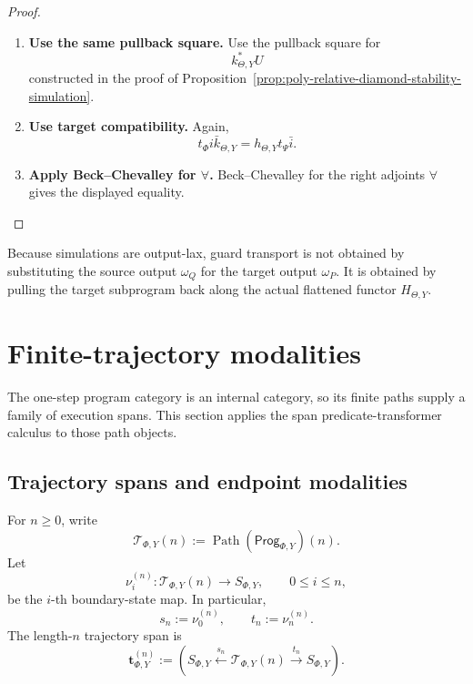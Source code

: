 \begin{proof}
\leavevmode
\begin{enumerate}
\item \textbf{Use the same pullback square.}
Use the pullback square for
\[
k_{\Theta,Y}^\ast U
\]
constructed in the proof of
Proposition~\ref{prop:poly-relative-diamond-stability-simulation}.

\item \textbf{Use target compatibility.}
Again,
\[
t_\Phi i\bar k_{\Theta,Y}=h_{\Theta,Y}t_\Psi\bar i.
\]

\item \textbf{Apply Beck--Chevalley for \(\forall\).}
Beck--Chevalley for the right adjoints \(\forall\) gives the displayed
equality.
\end{enumerate}
\end{proof}

\begin{remark}
\label{rem:poly-relative-simulation-stability-meaning}
Because simulations are output-lax, guard transport is not obtained by
substituting the source output \(\omega_Q\) for the target output
\(\omega_P\).  It is obtained by pulling the target subprogram back along the
actual flattened functor \(H_{\Theta,Y}\).
\end{remark}



\section{Finite-trajectory modalities}
\label{sec:dynamic-finite-trajectory-modalities}

The one-step program category is an internal category, so its finite paths
supply a family of execution spans.  This section applies the span
predicate-transformer calculus to those path objects.

\subsection{Trajectory spans and endpoint modalities}
\label{subsec:dynamic-trajectory-endpoint-modalities}

For \(n\geq0\), write
\[
    \mathscr T_{\Phi,Y}(n)
    :=
    \operatorname{Path}(\mathsf{Prog}_{\Phi,Y})(n).
\]
Let
\[
    \nu_i^{(n)}:
    \mathscr T_{\Phi,Y}(n)\to S_{\Phi,Y},
    \qquad
    0\leq i\leq n,
\]
be the \(i\)-th boundary-state map.  In particular,
\[
    s_n:=\nu_0^{(n)},
    \qquad
    t_n:=\nu_n^{(n)}.
\]
The length-\(n\) trajectory span is
\[
    \mathbf t_{\Phi,Y}^{(n)}
    :=
    \left(
    S_{\Phi,Y}
    \xleftarrow{s_n}
    \mathscr T_{\Phi,Y}(n)
    \xrightarrow{t_n}
    S_{\Phi,Y}
    \right).
\]

